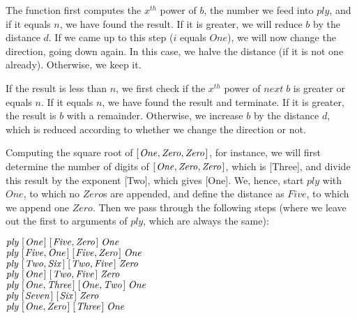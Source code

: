 \documentclass{scrreprt}
\newcommand{\Conid}[1]{\mathit{#1}}
\newcommand{\Varid}[1]{\mathit{#1}}
\begin{document}
{The function first computes the $x^{th}$ power of \ensuremath{\Varid{b}},
the number we feed into \ensuremath{\Varid{ply}}, and
if it equals \ensuremath{\Varid{n}}, we have found the result.
If it is greater, we will reduce \ensuremath{\Varid{b}} by the distance \ensuremath{\Varid{d}}.
If we came up to this step (\ensuremath{\Varid{i}} equals \ensuremath{\Conid{One}}),
we will now change the direction, going down again.
In this case, we halve the distance (if it is not one already).
Otherwise, we keep it.

If the result is less than \ensuremath{\Varid{n}},
we first check if the $x^{th}$ power of \ensuremath{\Varid{next}\;\Varid{b}} 
is greater or equals \ensuremath{\Varid{n}}.
If it equals \ensuremath{\Varid{n}}, we have found the result and terminate.
If it is greater, the result is \ensuremath{\Varid{b}} with a remainder.
Otherwise, we increase \ensuremath{\Varid{b}} by the distance \ensuremath{\Varid{d}},
which is reduced according to whether we change the direction or not.

Computing the square root of \ensuremath{[\mskip1.5mu \Conid{One},\Conid{Zero},\Conid{Zero}\mskip1.5mu]}, for instance,
we will first determine the number of digits of
\ensuremath{[\mskip1.5mu \Conid{One},\Conid{Zero},\Conid{Zero}\mskip1.5mu]}, which is [Three],
and divide this result by the exponent [Two],
which gives [One].
We, hence, start \ensuremath{\Varid{ply}} with \ensuremath{\Conid{One}}, to which no \ensuremath{\Conid{Zero}}s are appended,
and define the distance as \ensuremath{\Conid{Five}}, to which we append one \ensuremath{\Conid{Zero}}.
Then we pass through the following steps 
(where we leave out the first to arguments of \ensuremath{\Varid{ply}},
which are always the same):

\ensuremath{\Varid{ply}\;[\mskip1.5mu \Conid{One}\mskip1.5mu]\;[\mskip1.5mu \Conid{Five},\Conid{Zero}\mskip1.5mu]\;\Conid{One}}\\
\ensuremath{\Varid{ply}\;[\mskip1.5mu \Conid{Five},\Conid{One}\mskip1.5mu]\;[\mskip1.5mu \Conid{Five},\Conid{Zero}\mskip1.5mu]\;\Conid{One}}\\
\ensuremath{\Varid{ply}\;[\mskip1.5mu \Conid{Two},\Conid{Six}\mskip1.5mu]\;[\mskip1.5mu \Conid{Two},\Conid{Five}\mskip1.5mu]\;\Conid{Zero}}\\ 
\ensuremath{\Varid{ply}\;[\mskip1.5mu \Conid{One}\mskip1.5mu]\;[\mskip1.5mu \Conid{Two},\Conid{Five}\mskip1.5mu]\;\Conid{Zero}}\\
\ensuremath{\Varid{ply}\;[\mskip1.5mu \Conid{One},\Conid{Three}\mskip1.5mu]\;[\mskip1.5mu \Conid{One},\Conid{Two}\mskip1.5mu]\;\Conid{One}}\\
\ensuremath{\Varid{ply}\;[\mskip1.5mu \Conid{Seven}\mskip1.5mu]\;[\mskip1.5mu \Conid{Six}\mskip1.5mu]\;\Conid{Zero}}\\
\ensuremath{\Varid{ply}\;[\mskip1.5mu \Conid{One},\Conid{Zero}\mskip1.5mu]\;[\mskip1.5mu \Conid{Three}\mskip1.5mu]\;\Conid{One}}

}
\end{document}
